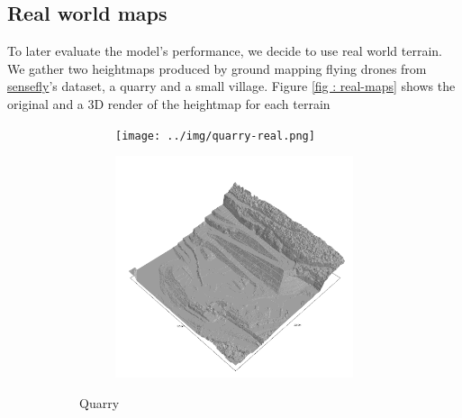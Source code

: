\documentclass[../document.tex]{subfiles}
\begin{document}
\subsection{Real world maps}
To later evaluate the model's performance, we decide to use real world terrain. We gather two heightmaps produced by ground mapping flying drones from \href{https://www.sensefly.com/education/datasets/}{sensefly}'s dataset, a quarry and a small village. Figure \ref{fig : real-maps} shows the original and a 3D render of the heightmap for each terrain
\begin{figure}[htbp]
    \centering
    \begin{subfigure}[b]{1\textwidth}
    \begin{subfigure}[b]{0.45\textwidth}
        \texttt{[image: ../img/quarry-real.png]}
    \end{subfigure}
    \begin{subfigure}[b]{0.45\textwidth}
        \includegraphics[width=\textwidth]{../img/hm3d_borders/querry-big-10.png}
    \end{subfigure}
    \caption{Quarry}
    \label{fig : real-maps-quarry}
\end{subfigure}
\begin{subfigure}[b]{1\textwidth}
    \begin{subfigure}[b]{0.45\textwidth}

\end{subfigure}
\end{subfigure}
\end{figure}
\end{document}
